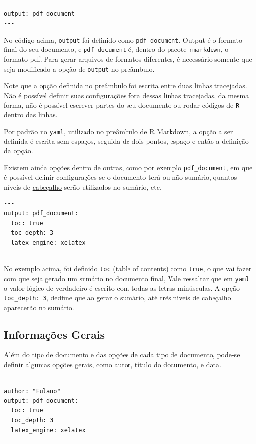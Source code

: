 \documentclass[
]{book}
\begin{document}
\begin{verbatim}
---
output: pdf_document
---
\end{verbatim}

No código acima, \texttt{output} foi definido como \texttt{pdf\_document}. Output é o formato final do seu documento, e \texttt{pdf\_document} é, dentro do pacote \texttt{rmarkdown}, o formato pdf. Para gerar arquivos de formatos diferentes, é necessário somente que seja modificado a opção de \texttt{output} no preâmbulo.

Note que a opção definida no preâmbulo foi escrita entre duas linhas tracejadas. Não é possível definir suas configurações fora dessas linhas tracejadas, da mesma forma, não é possível escrever partes do seu documento ou rodar códigos de \texttt{R} dentro das linhas.

Por padrão no \texttt{yaml}, utilizado no preâmbulo de R Markdown, a opção a ser definida é escrita sem espaços, seguida de dois pontos, espaço e então a definição da opção.

Existem ainda opções dentro de outras, como por exemplo \texttt{pdf\_document}, em que é possível definir configurações se o documento terá ou não sumário, quantos níveis de \protect\hyperlink{cabeuxe7alhos}{cabeçalho} serão utilizados no sumário, etc.

\begin{verbatim}
---
output: pdf_document:
  toc: true
  toc_depth: 3
  latex_engine: xelatex
---
\end{verbatim}

No exemplo acima, foi definido \texttt{toc} (table of contents) como \texttt{true}, o que vai fazer com que seja gerado um sumário no documento final, Vale ressaltar que em \texttt{yaml} o valor lógico de verdadeiro é escrito com todas as letras minúsculas. A opção \texttt{toc\_depth:\ 3}, dedfine que ao gerar o sumário, até três níveis de \protect\hyperlink{cabeuxe7alhos}{cabeçalho} aparecerão no sumário.

\hypertarget{informauxe7uxf5es-gerais}{%
\subsection{Informações Gerais}\label{informauxe7uxf5es-gerais}}

Além do tipo de documento e das opções de cada tipo de documento, pode-se definir algumas opções gerais, como autor, título do documento, e data.

\begin{verbatim}
---
author: "Fulano"
output: pdf_document:
  toc: true
  toc_depth: 3
  latex_engine: xelatex
---
\end{verbatim}
\end{document}

